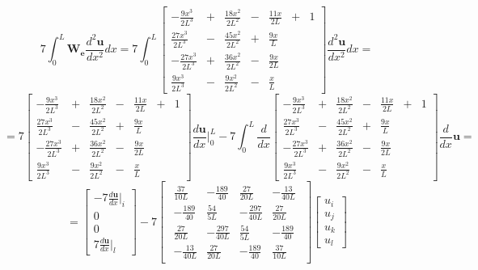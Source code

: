 $$7 \int_0^L \mathbf{W_e} \frac{d^2 \mathbf{u}}{dx^2} dx
=
7\int_0^L
\begin{bmatrix}
	-\frac{9x^3}{2L^3}&+&\frac{18x^2}{2L^2}&-&\frac{11x}{2L} &+& 1\\
	\frac{27x^3}{2L^3}&-&\frac{45x^2}{2L^2}&+&\frac{9x}{L}&&\\
	-\frac{27x^3}{2L^3}&+&\frac{36x^2}{2L^2}&-&\frac{9x}{2L}&&\\
	\frac{9x^3}{2L^3}&-&\frac{9x^2}{2L^2}&-&\frac{x}{L}&&
\end{bmatrix}
\frac{d^2 \mathbf{u}}{dx^2} dx
=
$$
$$
=
7
\begin{bmatrix}
	-\frac{9x^3}{2L^3}&+&\frac{18x^2}{2L^2}&-&\frac{11x}{2L} &+& 1\\
	\frac{27x^3}{2L^3}&-&\frac{45x^2}{2L^2}&+&\frac{9x}{L}&&\\
	-\frac{27x^3}{2L^3}&+&\frac{36x^2}{2L^2}&-&\frac{9x}{2L}&&\\
	\frac{9x^3}{2L^3}&-&\frac{9x^2}{2L^2}&-&\frac{x}{L}&&
\end{bmatrix}
\frac{d\mathbf{u}}{dx} |_0^L
  -7  \int_0^L \frac{d}{dx}
\begin{bmatrix}
	-\frac{9x^3}{2L^3}&+&\frac{18x^2}{2L^2}&-&\frac{11x}{2L} &+& 1\\
	\frac{27x^3}{2L^3}&-&\frac{45x^2}{2L^2}&+&\frac{9x}{L}&&\\
	-\frac{27x^3}{2L^3}&+&\frac{36x^2}{2L^2}&-&\frac{9x}{2L}&&\\
	\frac{9x^3}{2L^3}&-&\frac{9x^2}{2L^2}&-&\frac{x}{L}&&
\end{bmatrix}
\frac{d}{dx} \mathbf{u}
=$$
$$
=
\begin{bmatrix}
	  -7 \frac{d\mathbf{u}}{dx}|_i \\
	0\\
	0\\
7\frac{d\mathbf{u}}{dx}|_l
\end{bmatrix}
  -7 
\begin{bmatrix}
\begin{array}{rrrr}
	\frac{37}{10L} & -\frac{189}{40} & \frac{27}{20L} & -\frac{13}{40L}\\
	-\frac{189}{40} & \frac{54}{5L} & -\frac{297}{40L} & \frac{27}{20L}\\
	\frac{27}{20L} &  -\frac{297}{40L} & \frac{54}{5L} & -\frac{189}{40}\\
	-\frac{13}{40L} & \frac{27}{20L} & -\frac{189}{40} & \frac{37}{10L}
\end{array}
\end{bmatrix}
\begin{bmatrix}
u_i \\
u_j \\
u_k\\
u_l
\end{bmatrix}
$$




